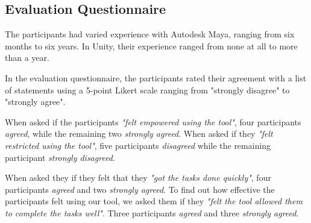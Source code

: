 \subsection{Evaluation Questionnaire}
The participants had varied experience with Autodesk Maya, ranging from six months to six years. In Unity, their experience ranged from none at all to more than a year.

In the evaluation questionnaire, the participants rated their agreement with a list of statements using a 5-point Likert scale ranging from "strongly disagree" to "strongly agree". 


When asked if the participants \textit{"felt empowered using the tool"}, four participants \textit{agreed}, while the remaining two \textit{strongly agreed}. When asked if they \textit{"felt restricted using the tool"}, five participants \textit{disagreed} while the remaining participant \textit{strongly disagreed}.

When asked they if they felt that they \textit{"got the tasks done quickly"}, four participants \textit{agreed} and two \textit{strongly agreed}. To find out how effective the participants felt using our tool, we asked them if they \textit{"felt the tool allowed them to complete the tasks well"}. Three participants \textit{agreed} and three \textit{strongly agreed}.


